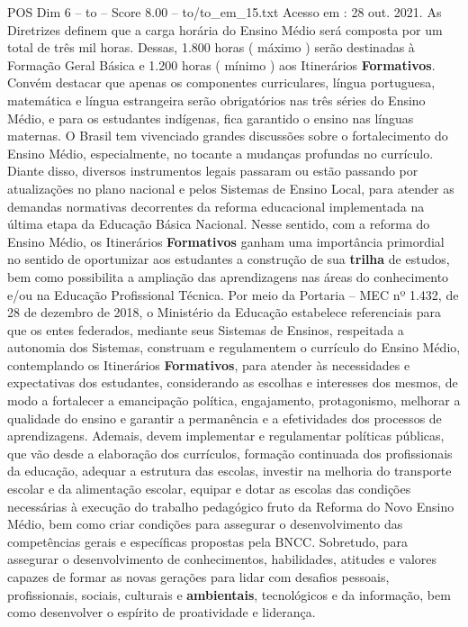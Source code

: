 \begin{textsample}{POS Dim 6 – to – Score 8.00 – to/to\_em\_15.txt}
Acesso em : 28 out. 2021.
As Diretrizes definem que a carga horária do Ensino Médio será composta por um total de três mil horas.
Dessas, 1.800 horas ( máximo ) serão destinadas à Formação Geral Básica e 1.200 horas ( mínimo ) aos Itinerários \textbf{Formativos}.
Convém destacar que apenas os componentes curriculares, língua portuguesa, matemática e língua estrangeira serão obrigatórios nas três séries do Ensino Médio, e para os estudantes indígenas, fica garantido o ensino nas línguas maternas.
O Brasil tem vivenciado grandes discussões sobre o fortalecimento do Ensino Médio, especialmente, no tocante a mudanças profundas no currículo.
Diante disso, diversos instrumentos legais passaram ou estão passando por atualizações no plano nacional e pelos Sistemas de Ensino Local, para atender as demandas normativas decorrentes da reforma educacional implementada na última etapa da Educação Básica Nacional.
Nesse sentido, com a reforma do Ensino Médio, os Itinerários \textbf{Formativos} ganham uma importância primordial no sentido de oportunizar aos estudantes a construção de sua \textbf{trilha} de estudos, bem como possibilita a ampliação das aprendizagens nas áreas do conhecimento e/ou na Educação Profissional Técnica.
Por meio da Portaria – MEC nº 1.432, de 28 de dezembro de 2018, o Ministério da Educação estabelece referenciais para que os entes federados, mediante seus Sistemas de Ensinos, respeitada a autonomia dos Sistemas, construam e regulamentem o currículo do Ensino Médio, contemplando os Itinerários \textbf{Formativos}, para atender às necessidades e expectativas dos estudantes, considerando as escolhas e interesses dos mesmos, de modo a fortalecer a emancipação política, engajamento, protagonismo, melhorar a qualidade do ensino e garantir a permanência e a efetividades dos processos de aprendizagens.
Ademais, devem implementar e regulamentar políticas públicas, que vão desde a elaboração dos currículos, formação continuada dos profissionais da educação, adequar a estrutura das escolas, investir na melhoria do transporte escolar e da alimentação escolar, equipar e dotar as escolas das condições necessárias à execução do trabalho pedagógico fruto da Reforma do Novo Ensino Médio, bem como criar condições para assegurar o desenvolvimento das competências gerais e específicas propostas pela BNCC.
Sobretudo, para assegurar o desenvolvimento de conhecimentos, habilidades, atitudes e valores capazes de formar as novas gerações para lidar com desafios pessoais, profissionais, sociais, culturais e \textbf{ambientais}, tecnológicos e da informação, bem como desenvolver o espírito de proatividade e liderança.

\end{textsample}
